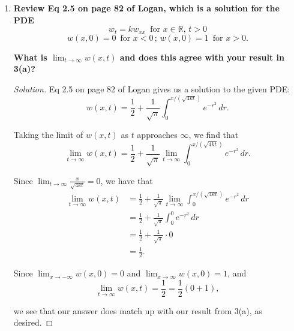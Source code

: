 \documentclass[11pt]{article}
\newenvironment{solution}
  {\renewcommand\qedsymbol{$\blacksquare$}\begin{proof}[Solution]}
  {\end{proof}}
\begin{document}
\begin{enumerate}
\begin{enumerate}
\begin{solution}
Factoring out the constants $a$ and $b$ and using the fact that \[\int_{-\infty}^{0} e^{-r^2} \, dr = \int_{0}^{\infty} e^{-r^2} \, dr = \frac{\sqrt{\pi}}{2},\] we have that
\begin{align*} \lim_{t \rightarrow \infty} u(x, t) &= \frac{1}{\sqrt{\pi}} \left[\int_{-\infty}^{0} e^{-r^2} b \, dr + \int_{0}^{\infty} e^{-r^2} a  \, dr  \right] \\
&= \frac{1}{\sqrt{\pi}} \left[ b \int_{-\infty}^{0} e^{-r^2} \, dr + a \int_{0}^{\infty} e^{-r^2} \, dr \right] \\
&= \frac{1}{\sqrt{\pi}} \left[b \frac{\sqrt{\pi}}{2} + a \frac{\sqrt{\pi}}{2} \right] \\
&= \frac{1}{2} (a+b).
\end{align*}

Thus, we have that \[\boxed{\lim_{t\rightarrow \infty} u (x, t) = \frac{1}{2} (a+b)}.\]
\end{solution}




\item \textbf{Review Eq 2.5 on page 82 of Logan, which is a solution for the PDE}
\[ w_t = kw_{xx} \, \, \, \text{for } x \in \mathbb{R}, \, t > 0\]
\[ w(x, 0) = 0 \, \, \,\text{for } x < 0 \, ; \, w(x, 0) = 1 \, \, \, \text{for } x > 0.\]

\textbf{What is $\lim_{t \rightarrow \infty} w(x, t)$ and does this agree with your result in 3(a)?}

\begin{solution}
Eq 2.5 on page 82 of Logan gives us a solution to the given PDE:
\[ w(x, t) = \frac{1}{2} + \frac{1}{\sqrt{\pi}} \int_0^{x/(\sqrt{4kt})} e^{-r^2} \, dr.\]

Taking the limit of $w(x, t)$ as $t$ approaches $\infty$, we find that 
\[\lim_{t \rightarrow \infty} w(x, t) = \frac{1}{2} + \frac{1}{\sqrt{\pi}} \lim_{t \rightarrow \infty} \int_0^{x/(\sqrt{4kt})} e^{-r^2} \, dr.\]

Since $\lim_{t \rightarrow \infty} \frac{x}{\sqrt{4kt}} = 0$, we have that 
\begin{align*} \lim_{t \rightarrow \infty} w(x, t) &= \frac{1}{2} + \frac{1}{\sqrt{\pi}} \lim_{t \rightarrow \infty} \int_0^{x/(\sqrt{4kt})} e^{-r^2} \, dr \\
&= \frac{1}{2} + \frac{1}{\sqrt{\pi}} \int_0^0 e^{-r^2} \, dr \\
&= \frac{1}{2} + \frac{1}{\sqrt{\pi}} \cdot 0 \\ &= \frac{1}{2}.\end{align*}

Since $\lim_{x \rightarrow -\infty} w(x, 0) = 0$ and $\lim_{x \rightarrow \infty} w(x, 0) = 1$, and 
\[\lim_{t \rightarrow \infty} w(x, t)= \frac{1}{2} = \frac{1}{2} (0 + 1),\]

we see that our answer does match up with our result from 3(a), as desired.
\end{solution}
\end{enumerate}
\end{enumerate}
\end{document}
